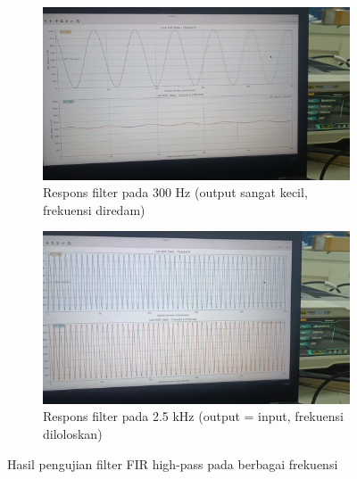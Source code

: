 \documentclass{article}
\begin{document}
\begin{figure}[H]
\begin{subfigure}{0.45\textwidth}
    \centering
    \includegraphics[width=\textwidth]{300Hz.png}
    \caption{Respons filter pada 300 Hz (output sangat kecil, frekuensi diredam)}
    \label{fig:300hz}
\end{subfigure}
\hfill
\begin{subfigure}{0.45\textwidth}
    \centering
    \includegraphics[width=\textwidth]{2k5Hz.png}
    \caption{Respons filter pada 2.5 kHz (output = input, frekuensi diloloskan)}
    \label{fig:2k5hz}
\end{subfigure}

\caption{Hasil pengujian filter FIR high-pass pada berbagai frekuensi}
\label{fig:results}
\end{figure}
\end{document}
